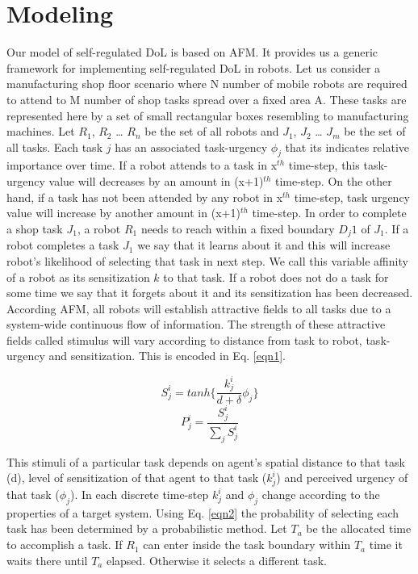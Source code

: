 \documentclass{llncs}
\begin{document}
\section{Modeling}
\label{sec:model}
Our model of self-regulated DoL  is based on AFM. It provides us a generic framework for implementing self-regulated  DoL in robots. Let us consider a manufacturing shop floor scenario where N number of mobile robots  are required to attend to M number of shop tasks spread over a fixed area A.   These tasks are represented here by a set of small rectangular boxes resembling to manufacturing machines.  Let  $R_1$, $R_2$ … $R_n$ be the set of all robots and $J_1$, $J_2$ … $J_m$ be the set of  all tasks.  Each task $j$ has an associated task-urgency $\phi_j$  that its indicates relative importance over time. If a robot attends to a task in  x$^{th}$ time-step, this task-urgency value will decreases by an amount in (x+1)$^{th}$ time-step. On the other hand, if a task has not been attended by any robot in  x$^{th}$ time-step, task urgency value will increase by another amount in (x+1)$^{th}$ time-step.  In order to complete a shop  task $J_1$, a robot $R_1$ needs to reach within a fixed boundary $D_j1$ of  $J_1$.  If a robot completes a task   $J_1$ we say that it learns about it and this will increase robot's likelihood of selecting that task in next step. We call this variable affinity of a robot as its sensitization $k$ to that task. If a robot does not do a task for some time we say that it forgets about it and its sensitization has been decreased.\\
According AFM, all robots will establish attractive fields to all tasks due to a system-wide continuous flow of information. The strength of these attractive fields called stimulus will vary according to  distance from task to robot, task-urgency and sensitization. This is encoded in Eq. \ref{eqn1}.
\begin{small}
\begin{multicols}{2} 
\begin{equation}
S_{j}^{i} = tanh\{\frac{k_{j}^{i}}{d+\delta } \phi _{j}\}
\label{eqn1}
\end{equation}
\vspace*{0.25cm}
\begin{equation}
P_{j}^{i} = \frac{S_{j}^{i}}{\sum_{j}^{}S_{j}^{i}}
\label{eqn2}
\end{equation}
\end{multicols}
\end{small}
This stimuli of a particular task depends on agent's spatial distance to that task (d), level of sensitization of that agent to that task ($k_{j}^{i}$) and perceived urgency of that task ($\phi _{j}$). In each discrete time-step $k_{j}^{i}$ and $\phi _{j}$ change according to the properties of a target system. Using Eq. \ref{eqn2} the probability of selecting each task has been determined by a probabilistic method. Let $T_a$ be the allocated time to accomplish a task. If $R_1$ can enter inside the task boundary  within $T_a$ time it waits there until $T_a$ elapsed. Otherwise it selects a different task.
\end{document}

